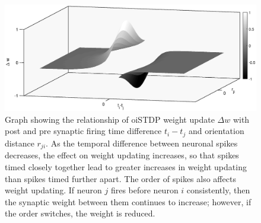 \begin{figure}
	\centering
	\includegraphics[width=\linewidth]{fig/fmridti/aiSTDP.eps}
	\caption{Graph showing the relationship of oiSTDP weight update $\Delta w$ with post and pre synaptic firing time difference $t_i-t_j$ and orientation distance $r_{ji}$. As the temporal difference between neuronal spikes decreases, the effect on weight updating increases, so that spikes timed closely together lead to greater increases in weight updating than spikes timed further apart. The order of spikes also affects weight updating. If neuron $j$ fires before neuron $i$ consistently, then the synaptic weight between them continues to increase; however, if the order switches, the weight is reduced.}
	\label{fig:aiSTDP_graph}
\end{figure}

